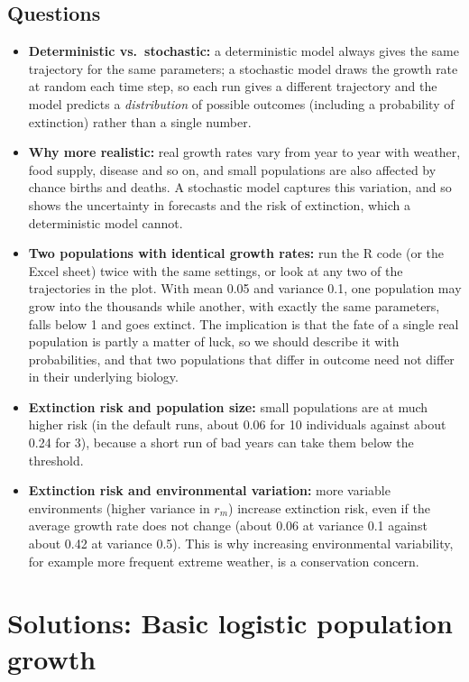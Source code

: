 \documentclass[
  a4paper]{book}
\providecommand{\tightlist}{%
  \setlength{\itemsep}{0pt}\setlength{\parskip}{0pt}}
\begin{document}
\subsection{Questions}\label{questions-12}

\begin{itemize}
\tightlist
\item
  \textbf{Deterministic vs.~stochastic:} a deterministic model always gives the same trajectory for the same parameters; a stochastic model draws the growth rate at random each time step, so each run gives a different trajectory and the model predicts a \emph{distribution} of possible outcomes (including a probability of extinction) rather than a single number.
\item
  \textbf{Why more realistic:} real growth rates vary from year to year with weather, food supply, disease and so on, and small populations are also affected by chance births and deaths. A stochastic model captures this variation, and so shows the uncertainty in forecasts and the risk of extinction, which a deterministic model cannot.
\item
  \textbf{Two populations with identical growth rates:} run the R code (or the Excel sheet) twice with the same settings, or look at any two of the trajectories in the plot. With mean 0.05 and variance 0.1, one population may grow into the thousands while another, with exactly the same parameters, falls below 1 and goes extinct. The implication is that the fate of a single real population is partly a matter of luck, so we should describe it with probabilities, and that two populations that differ in outcome need not differ in their underlying biology.
\item
  \textbf{Extinction risk and population size:} small populations are at much higher risk (in the default runs, about 0.06 for 10 individuals against about 0.24 for 3), because a short run of bad years can take them below the threshold.
\item
  \textbf{Extinction risk and environmental variation:} more variable environments (higher variance in \(r_m\)) increase extinction risk, even if the average growth rate does not change (about 0.06 at variance 0.1 against about 0.42 at variance 0.5). This is why increasing environmental variability, for example more frequent extreme weather, is a conservation concern.
\end{itemize}

\section{Solutions: Basic logistic population growth}\label{solutions-basic-logistic-population-growth}
\end{document}
